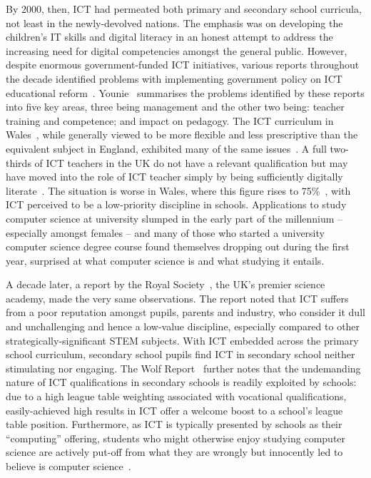 \documentclass{sig-alternate}
\begin{document}
By 2000, then, ICT had permeated both primary and secondary school
curricula, not least in the newly-devolved nations. The emphasis was
on developing the children's IT skills and digital literacy in an
honest attempt to address the increasing need for digital competencies
amongst the general public.  However, despite enormous
government-funded ICT initiatives, various reports throughout the
decade identified problems with implementing government policy on ICT
educational
reform~\cite{OpieFukuyo:2000,Ofsted:2001,Ofsted:2002,Ofsted:2004,
Loveless:2005}. Younie~\cite{Younie:2006} summarises the problems
identified by these reports into five key areas, three being
management and the other two being: teacher training and competence;
and impact on pedagogy.  The ICT curriculum in
Wales~\cite{welshictcurric:2008}, while generally viewed to be more
flexible and less prescriptive than the equivalent subject in England,
exhibited many of the same
issues~\cite{estynict:2007,estynict:2013,estynict:2014}. A full
two-thirds of ICT teachers in the UK do not have a relevant
qualification but may have moved into the role of ICT teacher simply
by being sufficiently digitally literate~\cite{RoyalSoc:2012}.  The
situation is worse in Wales, where this figure rises to
75\%~\cite{GTCW:2008}, with ICT perceived to be a low-priority
discipline in schools. Applications to study computer science at
university slumped in the early part of the millennium -- especially
amongst females -- and many of those who started a university computer
science degree course found themselves dropping out during the first
year, surprised at what computer science is and what studying it
entails.

A decade later, a report by the Royal Society~\cite{RoyalSoc:2012},
the UK's premier science academy, made the very same observations.
The report noted that ICT suffers from a poor reputation amongst
pupils, parents and industry, who consider it dull and unchallenging
and hence a low-value discipline, especially compared to other
strategically-significant STEM subjects.  With ICT embedded across the
primary school curriculum, secondary school pupils find ICT in
secondary school neither stimulating nor engaging. The Wolf
Report~\cite{Wolf:2011} further notes that the undemanding nature of
ICT qualifications in secondary schools is readily exploited by schools:
due to a high league table weighting associated with
vocational qualifications, easily-achieved high results in ICT offer a
welcome boost to a school's league table position. Furthermore, as ICT
is typically presented by schools as their ``computing'' offering,
students who might otherwise enjoy studying computer science are
actively put-off from what they are wrongly but innocently
led to believe is computer
science~\cite{crick+sentance:2011,brown-et-al-sigcse2012}.
\end{document}
